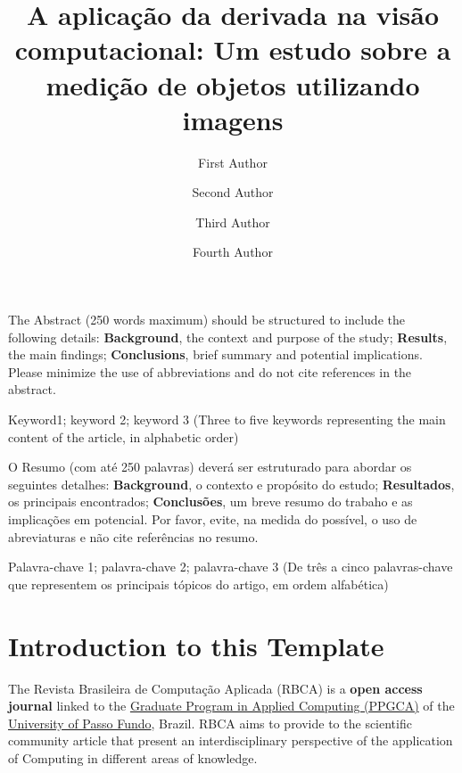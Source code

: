 \documentclass[a4paper,alpha-refs]{RBCA_v1.0}
\title{A aplicação da derivada na visão computacional: Um estudo sobre a medição de objetos utilizando imagens}
\author[1]{First Author}
\author[2]{Second Author}
\author[2]{Third Author}
\author[2]{Fourth Author}
\affil[1]{First Institution}
\affil[2]{Second Institution}
\begin{document}
\begin{frontmatter}
	
\maketitle

\begin{Abstract} %
The Abstract (250 words maximum) should be structured to include the following details: \textbf{Background}, the context and purpose of the study; \textbf{Results}, the main findings; \textbf{Conclusions}, brief summary and potential implications. Please minimize the use of abbreviations and do not cite references in the abstract.
\end{Abstract}

\begin{keywords}
Keyword1; keyword 2; keyword 3 (Three to five keywords representing the main content of the article, in alphabetic order)
\end{keywords}

\begin{resumo} %
	O Resumo (com até 250 palavras) deverá ser estruturado para abordar os seguintes detalhes: \textbf{Background}, o contexto e propósito do estudo; \textbf{Resultados}, os principais encontrados; \textbf{Conclusões}, um breve resumo do trabaho e as implicações em potencial. Por favor, evite, na medida do possível, o uso de abreviaturas e não cite referências no resumo.
\end{resumo}

\begin{palavras_chave} %
	Palavra-chave 1; palavra-chave 2; palavra-chave 3 (De três a cinco palavras-chave que representem os principais tópicos do artigo, em ordem alfabética)
\end{palavras_chave}

\end{frontmatter}


\section{Introduction to this Template}

The Revista Brasileira de Computação Aplicada (RBCA) is a \textbf{open access journal} linked to the \href{http://ppgca.upf.br}{Graduate Program in Applied Computing (PPGCA)} of the \href{http://www.upf.br}{University of Passo Fundo}, Brazil. RBCA aims to provide to the scientific community article that present an interdisciplinary perspective of the application of Computing in different areas of knowledge.
\end{document}

